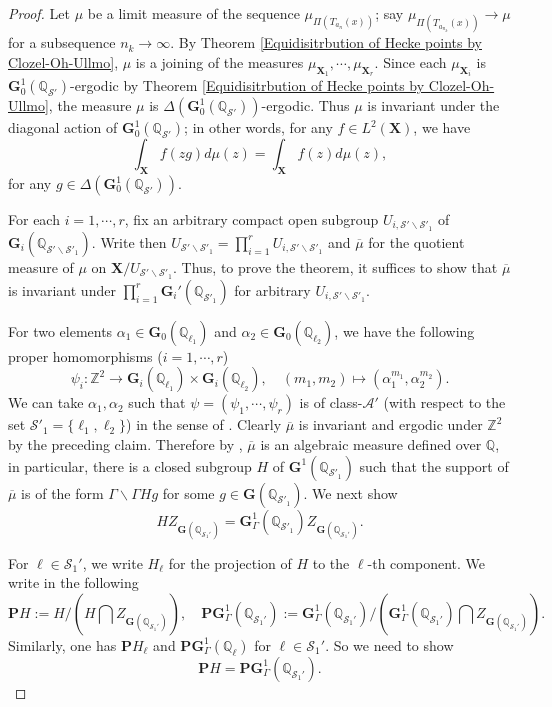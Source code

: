 \documentclass[11pt,oneside,reqno]{amsart}
\newcommand{\bfG}{\mathbf{G}}
\newcommand{\Q}{\mathbb{Q}}
\newcommand{\Scal}{\mathcal{S}}
\newcommand{\Gbf}{\mathbf{G}}
\newcommand{\Pbf}{\mathbf{P}}
\newcommand{\bcS}{\mathcal{S}}
\newcommand{\bfX}{\mathbf{X}}
\theoremstyle{plain}
\begin{document}
	\begin{proof}
		Let $\mu$ be a limit measure of the sequence $\mu_{\Pi(T_{a_n}(x))}$; say $\mu_{\Pi(T_{a_{n_k}}(x))}\to\mu$ for a subsequence $n_k\to\infty$. By Theorem \ref{Equidisitrbution of Hecke points by Clozel-Oh-Ullmo}, $\mu$ is a joining of the measures $\mu_{\bfX_1},\cdots,\mu_{\bfX_r}$.
		Since each $\mu_{\bfX_i}$ is $\bfG_0^1(\Q_{\bcS'})$-ergodic by Theorem \ref{Equidisitrbution of Hecke points by Clozel-Oh-Ullmo}, the measure $\mu$ is $\Delta(\Gbf_0^1(\Q_{\Scal'}))$-ergodic. Thus $\mu$ is invariant under the diagonal action of $\bfG_0^1(\Q_{\bcS'})$; in other words, for any $f\in L^2(\bfX)$, we have
		\[
		\int_{\bfX}f(zg)d\mu(z)=\int_{\bfX}f(z)d\mu(z),
		\]
		for any $g\in\Delta(\bfG_0^1(\Q_{\bcS'}))$.
		
		
		
		For each $i=1,\cdots,r$, fix an arbitrary compact open subgroup $U_{i,{\bcS'}\backslash\bcS'_1}$ of $\bfG_i(\Q_{{\bcS'}\backslash\bcS'_1})$. Write then $U_{{\bcS'}\backslash\bcS'_1}=\prod_{i=1}^rU_{i,{\bcS'}\backslash\bcS'_1}$ and $\overline{\mu}$ for the quotient measure of $\mu$ on $\bfX/U_{{\bcS'}\backslash\bcS'_1}$. Thus, to prove the theorem, it suffices to show that $\overline{\mu}$ is invariant under $\prod_{i=1}^r\bfG_i'(\Q_{\bcS'_1})$ for arbitrary $U_{i,{\bcS'}\backslash\bcS'_1}$.
		
		
		For two elements $\alpha_1\in\bfG_0(\Q_{\ell_1})$ and $\alpha_2\in\bfG_0(\Q_{\ell_2})$, we have the following proper homomorphisms ($i=1,\cdots,r$)
		\[
		\psi_i
		\colon
		\mathbb{Z}^2
		\to
		\bfG_i(\Q_{\ell_1})\times\bfG_i(\Q_{\ell_2}),
		\quad
		(m_1,m_2)
		\mapsto
		(\alpha_1^{m_1},\alpha_2^{m_2}).
		\]
		We can take $\alpha_1,\alpha_2$ such that $\psi=(\psi_1,\cdots,\psi_r)$ is of class-$\mathcal{A}'$ (with respect to the set $\bcS'_1=\{\ell_1,\ell_2\}$) in the sense of \cite[Definition 1.3]{EinsiedlerLindenstrauss2019}.
		Clearly $\overline{\mu}$ is invariant and ergodic under $\mathbb{Z}^2$ by the preceding claim. Therefore by \cite[Theorem 1.4]{EinsiedlerLindenstrauss2019}, $\overline{\mu}$ is an algebraic measure defined over $\Q$, in particular, there is a closed subgroup $H$ of $\bfG^1(\Q_{\bcS'_1})$ such that the support of $\overline{\mu}$ is of the form $\Gamma\backslash\Gamma Hg$ for some $g\in\bfG(\Q_{\bcS'_1})$. We next show
		\[
		HZ_{\Gbf(\Q_{\Scal_1'})}
		=\bfG_\Gamma^1(\Q_{\bcS'_1})Z_{\Gbf(\Q_{\Scal_1'})}.
		\]
		
		
		
		
		
		For $\ell\in\Scal_1'$, we write $H_\ell$ for the projection of $H$ to the $\ell$-th component. We write in the following
		\[
		\Pbf H
		:=H/(H\bigcap Z_{\Gbf(\Q_{\Scal_1'})}),
		\quad
		\Pbf\Gbf_\Gamma^1(\Q_{\Scal_1'})
		:=\Gbf_\Gamma^1(\Q_{\Scal_1'})/(\Gbf_\Gamma^1(\Q_{\Scal_1'})\bigcap Z_{\Gbf(\Q_{\Scal_1'})}).
		\]
		Similarly, one has $\Pbf H_\ell$ and $\Pbf\Gbf_\Gamma^1(\Q_\ell)$ for $\ell\in\Scal_1'$. So we need to show 
		\[
		\Pbf H=\Pbf\Gbf_\Gamma^1(\Q_{\Scal_1'}).
		\]
		

\end{proof}
\end{document}
